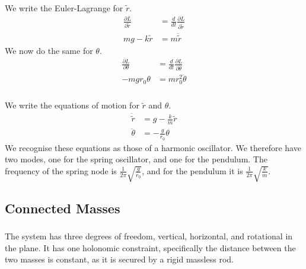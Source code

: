 \documentclass{article}
\begin{document}
\subsubsection{} %

We write the Euler-Lagrange for $\tilde{r}$.
\begin{align*}
	\frac{\partial L}{\partial \tilde{r}} &= \frac{d}{dt}\frac{\partial L}{\partial \dot{\tilde{r}}}\\
	mg - k\tilde{r} &= m\ddot{\tilde{r}}
\end{align*}
We now do the same for $\theta$.
\begin{align*}
	\frac{\partial L}{\partial \theta} &= \frac{d}{dt}\frac{\partial L}{\partial \dot{\theta}}\\
	-mgr_0\theta &= mr_0^2\ddot{\theta}
\end{align*}
\subsubsection{} %

We write the equations of motion for $\tilde{r}$ and $\theta$.
\begin{align*}
	\ddot{\tilde{r}} &= g - \frac{k}{m}\tilde{r}\\
	\ddot{\theta} &= -\frac{g}{r_0}\theta
\end{align*}
We recognise these equations as those of a harmonic oscillator. We therefore have two modes, one for the spring oscillator, and one for the pendulum. The frequency of the spring node is $\frac{1}{2\pi}\sqrt{\frac{g}{r_0}}$, and for the pendulum it is $\frac{1}{2\pi}\sqrt{\frac{k}{m}}$.

\subsection{Connected Masses}

\subsubsection{} %

The system has three degrees of freedom, vertical, horizontal, and rotational in the plane. It has one holonomic constraint, specifically the distance between the two masses is constant, as it is secured by a rigid massless rod.

\subsubsection{} %
\end{document}
